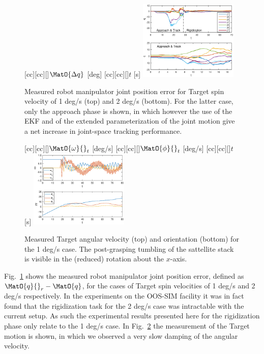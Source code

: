 %
\begin{figure}[t!]
[cc][cc][\FontFigB]{$\MatO{\Delta{q}}$ [deg]}
[cc][cc][\FontFigB]{$t$ [s]}
\centering\includegraphics[angle=0,width=0.42\textwidth]{./figures/joint_space_motion_2subplots}
\caption{Measured robot manipulator joint position error for Target spin velocity of 1 deg/s (top) and 2 deg/s (bottom). For the latter case, only the approach phase is shown, in which however the use of the EKF and of the extended parameterization of the joint motion give a net increase in joint-space tracking performance.}
\label{fig:joint_space_motion_2subplots}
\end{figure}
%
%
\begin{figure}[t!]
[cc][cc][\FontFigB]{$\MatO{\omega}{}_{t}$ [deg/s]}
[cc][cc][\FontFigB]{$\MatO{\phi}{}_{t}$ [deg/s]}
[cc][cc][\FontFigB]{$t$ [s]}
\centering\includegraphics[angle=0,width=0.42\textwidth]{./figures/Target_motion}
\caption{Measured Target angular velocity (top) and orientation (bottom) for the 1 deg/s case. The post-grasping tumbling of the sattellite stack is visible in the (reduced) rotation about the $x$-axis.}
\label{fig:Target_motion}
\end{figure}
%

Fig.~\ref{fig:joint_space_motion_2subplots} shows the measured robot manipulator joint position error, defined as $\MatO{q}{}_{r}-\MatO{q}$, for the cases of Target spin velocities of 1 deg/s and 2 deg/s respectively. In the experiments on the OOS-SIM facility it was in fact found that the rigidization task for the 2 deg/s case was intractable with the current setup.  As such the experimental results presented here for the rigidization phase only relate to the 1 deg/s case. In Fig.~\ref{fig:Target_motion} the measurement of the Target motion is shown, in which we observed a very slow damping of the angular velocity. 

